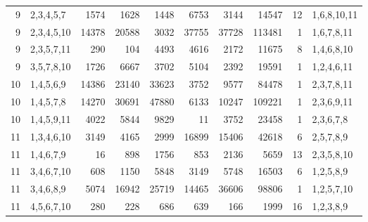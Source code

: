 \begin{table}[tp]
\begin{ruledtabular}
\begin{tabular}{rlrrrrrrrl}
9 & 2,3,4,5,7 & 1574 & 1628 & 1448 & 6753 & 3144 & 14547 & 12 & 1,6,8,10,11 \\
9 & 2,3,4,5,10 & 14378 & 20588 & 3032 & 37755 & 37728 & 113481 & 1 & 1,6,7,8,11 \\
9 & 2,3,5,7,11 & 290 & 104 & 4493 & 4616 & 2172 & 11675 & 8 & 1,4,6,8,10 \\
9 & 3,5,7,8,10 & 1726 & 6667 & 3702 & 5104 & 2392 & 19591 & 1 & 1,2,4,6,11 \\
10 & 1,4,5,6,9 & 14386 & 23140 & 33623 & 3752 & 9577 & 84478 & 1 & 2,3,7,8,11 \\
10 & 1,4,5,7,8 & 14270 & 30691 & 47880 & 6133 & 10247 & 109221 & 1 & 2,3,6,9,11 \\
10 & 1,4,5,9,11 & 4022 & 5844 & 9829 & 11 & 3752 & 23458 & 1 & 2,3,6,7,8 \\
11 & 1,3,4,6,10 & 3149 & 4165 & 2999 & 16899 & 15406 & 42618 & 6 & 2,5,7,8,9 \\
11 & 1,4,6,7,9 & 16 & 898 & 1756 & 853 & 2136 & 5659 & 13 & 2,3,5,8,10 \\
11 & 3,4,6,7,10 & 608 & 1150 & 5848 & 3149 & 5748 & 16503 & 6 & 1,2,5,8,9 \\
11 & 3,4,6,8,9 & 5074 & 16942 & 25719 & 14465 & 36606 & 98806 & 1 & 1,2,5,7,10 \\
11 & 4,5,6,7,10 & 280 & 228 & 686 & 639 & 166 & 1999 & 16 & 1,2,3,8,9 \\
\end{tabular}
\end{ruledtabular}
\end{table}
